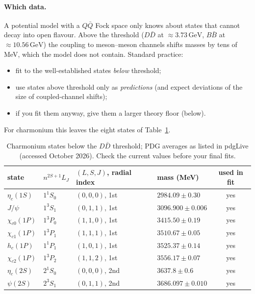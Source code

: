 \documentclass[11pt,a4paper]{article}
\numberwithin{equation}{section}
\theoremstyle{definition}
\theoremstyle{plain}
\theoremstyle{remark}
\numberwithin{algorithm}{section}
\newcommand{\GeV}{\,\mathrm{GeV}}
\begin{document}
\paragraph{Which data.} A potential model with a $Q\bar Q$ Fock space only knows about states that cannot decay into open flavour. Above the threshold ($D\bar D$ at $\approx3.73\GeV$, $B\bar B$ at $\approx10.56\GeV$) the coupling to meson--meson channels shifts masses by tens of MeV, which the model does not contain. Standard practice:
\begin{itemize}[leftmargin=1.3em,itemsep=2pt]
\item fit to the well-established states \emph{below} threshold;
\item use states above threshold only as \emph{predictions} (and expect deviations of the size of coupled-channel shifts);
\item if you fit them anyway, give them a larger theory floor (below).
\end{itemize}
For charmonium this leaves the eight states of Table~\ref{tab:ccdata}.

\begin{table}[h]\centering\small
\begin{tabular}{@{}llllc@{}}\toprule
state & $n^{2S+1}L_J$ & $(L,S,J)$, radial index & mass (MeV) & used in fit\\\midrule
$\eta_c(1S)$ & $1^1S_0$ & $(0,0,0)$, 1st & $2984.09\pm0.30$ & yes\\
$J/\psi$ & $1^3S_1$ & $(0,1,1)$, 1st & $3096.900\pm0.006$ & yes\\
$\chi_{c0}(1P)$ & $1^3P_0$ & $(1,1,0)$, 1st & $3415.50\pm0.19$ & yes\\
$\chi_{c1}(1P)$ & $1^3P_1$ & $(1,1,1)$, 1st & $3510.67\pm0.05$ & yes\\
$h_c(1P)$ & $1^1P_1$ & $(1,0,1)$, 1st & $3525.37\pm0.14$ & yes\\
$\chi_{c2}(1P)$ & $1^3P_2$ & $(1,1,2)$, 1st & $3556.17\pm0.07$ & yes\\
$\eta_c(2S)$ & $2^1S_0$ & $(0,0,0)$, 2nd & $3637.8\pm0.6$ & yes\\
$\psi(2S)$ & $2^3S_1$ & $(0,1,1)$, 2nd & $3686.097\pm0.010$ & yes\\\bottomrule
\end{tabular}
\caption{Charmonium states below the $D\bar D$ threshold; PDG averages as listed in pdgLive (accessed October 2026). Check the current values before your final fits.}\label{tab:ccdata}
\end{table}
\end{document}
